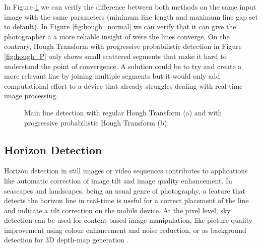In Figure \ref{fig:hough_methods} we can verify the difference between both methods on the same input image with the same parameters (minimum line length and maximum line gap set to default). In Figure \ref{fig:hough_normal} we can verify that it can give the photographer a a more reliable insight of were the lines converge. On the contrary, Hough Transform with progressive probabilistic detection in Figure \ref{fig:hough_P} only shows small scattered segments that make it hard to understand the point of convergence. A solution could be to try and create a more relevant line by joining multiple segments but it would only add computational effort to a device that already struggles dealing with real-time image processing.

\begin{figure}[htbp]
	\centering
  	\caption{Main line detection with regular Hough Transform (a) and with progressive probabilistic Hough Transform (b).}
    \label{fig:hough_methods}
\end{figure}

\subsection{Horizon Detection}
\label{sub:horizon_detection}

Horizon detection in still images or video sequences contributes to applications like automatic correction of image tilt and image quality enhancement. In seascapes and landscapes, being an usual genre of photography, a feature that detects the horizon line in real-time is useful for a correct placement of the line and indicate a tilt correction on the mobile device. At the pixel level, sky detection can be used for content-based image manipulation, like picture quality improvement using colour enhancement and noise reduction, or as background detection for 3D depth-map generation \cite{zafarifar2006blue}.


